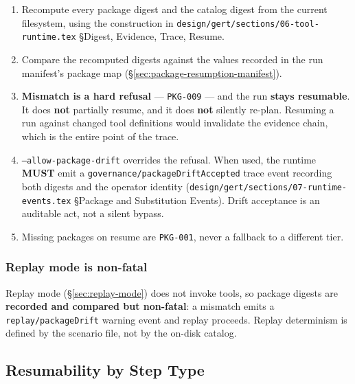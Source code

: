 \begin{enumerate}
  \item Recompute every package digest and the catalog digest from the
        current filesystem, using the construction in
        \texttt{design/gert/sections/06-tool-runtime.tex} \S Digest,
        Evidence, Trace, Resume.
  \item Compare the recomputed digests against the values recorded in the
        run manifest's package map (\S\ref{sec:package-resumption-manifest}).
  \item \textbf{Mismatch is a hard refusal} --- \texttt{PKG-009} --- and the
        run \textbf{stays resumable}. It does \textbf{not} partially resume,
        and it does \textbf{not} silently re-plan. Resuming a run against
        changed tool definitions would invalidate the evidence chain, which
        is the entire point of the trace.
  \item \texttt{--allow-package-drift} overrides the refusal. When used, the
        runtime \textbf{MUST} emit a \texttt{governance/packageDriftAccepted}
        trace event recording both digests and the operator identity
        (\texttt{design/gert/sections/07-runtime-events.tex}
        \S Package and Substitution Events). Drift acceptance is an
        auditable act, not a silent bypass.
  \item Missing packages on resume are \texttt{PKG-001}, never a fallback to
        a different tier.
\end{enumerate}

\subsubsection{Replay mode is non-fatal}

Replay mode (\S\ref{sec:replay-mode}) does not invoke tools, so package
digests are \textbf{recorded and compared but non-fatal}: a mismatch emits a
\texttt{replay/packageDrift} warning event and replay proceeds. Replay
determinism is defined by the scenario file, not by the on-disk catalog.

\subsection{Resumability by Step Type}

